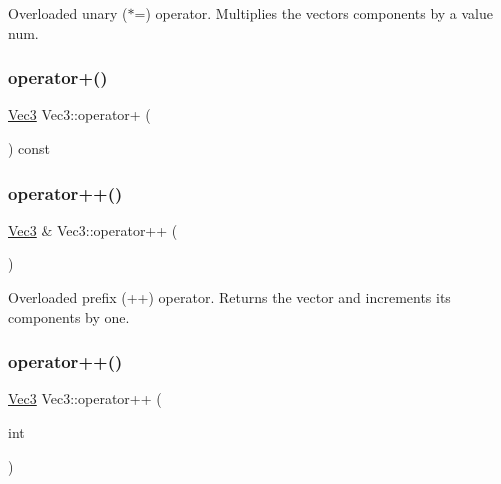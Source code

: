 Overloaded unary ($\ast$=) operator. Multiplies the vector\textquotesingle{}s components by a value num. 

\mbox{\label{classVec3_a188ff41ed049900acd16db6ac9d5ec4f}} 
\subsubsection{\texorpdfstring{operator+()}{operator+()}}
{\footnotesize\ttfamily \mbox{\hyperlink{classVec3}{Vec3}} Vec3\+::operator+ (\begin{DoxyParamCaption}{ }\end{DoxyParamCaption}) const\hspace{0.3cm}{\ttfamily [inline]}}

\mbox{\label{classVec3_a42af411be3202a44ae293cd5bfb50831}} 
\subsubsection{\texorpdfstring{operator++()}{operator++()}\hspace{0.1cm}{\footnotesize\ttfamily [1/2]}}
{\footnotesize\ttfamily \mbox{\hyperlink{classVec3}{Vec3}} \& Vec3\+::operator++ (\begin{DoxyParamCaption}{ }\end{DoxyParamCaption})}



Overloaded prefix (++) operator. Returns the vector and increments its components by one. 

\mbox{\label{classVec3_a847d6f000968553c2cf6b4780742a8c1}} 
\subsubsection{\texorpdfstring{operator++()}{operator++()}\hspace{0.1cm}{\footnotesize\ttfamily [2/2]}}
{\footnotesize\ttfamily \mbox{\hyperlink{classVec3}{Vec3}} Vec3\+::operator++ (\begin{DoxyParamCaption}\item[{int}]{ }\end{DoxyParamCaption})}



